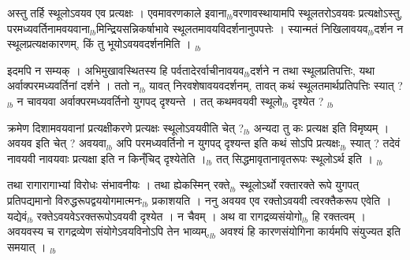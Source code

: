 \documentclass[article,12pt,a4paper]{memoir}%
\newcounter{parCount}
\begin{document}
	  
	  \pstart \leavevmode%
	अस्तु तर्हि स्थूलोऽवयव एव प्रत्यक्षः । एवमावरणकाले इवाना{\tiny $_{lb}$}वरणावस्थायामपि स्थूलतरोऽवयवः प्रत्यक्षोऽस्तु, परमध्यवर्तिनामवयवाना{\tiny $_{lb}$}मिन्द्रियसन्निकर्षाभावे स्थूलतमावयविदर्शनानुपपत्तेः । स्यान्मतं निखिलावयव{\tiny $_{lb}$}दर्शन न स्थूलप्रत्यक्षकारणम्, किं तु भूयोऽवयवदर्शनमिति ।
	{}
	\pend%
      {\tiny $_{lb}$}

	  
	  \pstart \leavevmode%
	इदमपि न सम्यक् । अभिमुखावस्थितस्य हि पर्वतादेरर्वाचीनावयव{\tiny $_{lb}$}दर्शने न तथा स्थूलप्रतिपत्तिः, यथा अर्वाक्परमध्यवर्तिनां दर्शने । ततो न{\tiny $_{lb}$} यावत् निरवशेषावयवदर्शनम्, तावत् कथं स्थूलतमार्थप्रतिपत्तिः स्यात् ?{\tiny $_{lb}$} न चावयवा अर्वाक्परमध्यवर्तिनो युगपद् दृश्यन्ते । तत् कथमवयवी स्थूलो{\tiny $_{lb}$} दृश्येत ?
	{}
	\pend%
      {\tiny $_{lb}$}

	  
	  \pstart \leavevmode%
	क्रमेण दिशामवयवानां प्रत्यक्षीकरणे प्रत्यक्षः स्थूलोऽवयवीति चेत् ?{\tiny $_{lb}$} अन्यदा तु कः प्रत्यक्ष इति विमृष्यम् । अवयव इति चेत् ? अवयवा{\tiny $_{lb}$}  \leavevmode{} अपि परमध्यवर्तिनो न युगपद् दृश्यन्त इति कथं सोऽपि प्रत्यक्षः{\tiny $_{lb}$} स्यात् ? तदेवं नावयवी नावयवाः प्रत्यक्षा इति न किन्ँचिद् दृश्येतेति ।{\tiny $_{lb}$} तत् \leavevmode{} सिद्धमावृतानावृतरूपः स्थूलोऽर्थ इति ।
	{}
	\pend%
      {\tiny $_{lb}$}

	  
	  \pstart \leavevmode%
	तथा रागारागाभ्यां विरोधः संभावनीयः । तथा ह्येकस्मिन् रक्ते{\tiny $_{lb}$} स्थूलोऽर्थो रक्तारक्ते रूपे युगपत् प्रतिपद्यमानो विरुद्धरूपद्वययोगमात्मनः{\tiny $_{lb}$} प्रकाशयति । ननु अवयव एव रक्तोऽवयवी त्वरक्तैकरूप एवेति । यद्येवं{\tiny $_{lb}$} रक्तेऽवयवेऽरक्तरूपोऽवयवी दृश्येत । न चैवम् । अथ वा रागद्रव्यसंयोगो{\tiny $_{lb}$} हि रक्तत्वम् । अवयवस्य च रागद्रव्येण संयोगेऽवयविनोऽपि तेन भाव्यम्,{\tiny $_{lb}$} अवश्यं हि कारणसंयोगिना कार्यमपि संयुज्यत इति समयात् ।
	{}
	\pend%
      {\tiny $_{lb}$}
\end{document}

